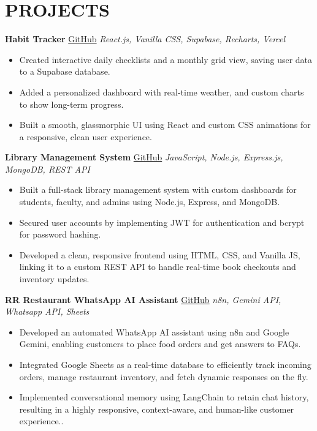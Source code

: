 \documentclass[letterpaper,11pt]{article}
\begin{document}
\section*{PROJECTS}

\noindent\textbf{Habit Tracker} \quad
\textcolor{blue}{\href{https://github.com/Rithwik007/habit-tracker-web2}{GitHub}} \hfill \textit{React.js, Vanilla CSS, Supabase, Recharts, Vercel}

\begin{itemize}
\item Created interactive daily checklists and a monthly grid view, saving user data to a Supabase database.
\item Added a personalized dashboard with real-time weather, and custom charts to show long-term progress.
\item Built a smooth, glassmorphic UI using React and custom CSS animations for a responsive, clean user experience.

\end{itemize}

\noindent\textbf{Library Management System} \quad
\textcolor{blue}{\href{https://github.com/Rithwik007/Library-Management}{GitHub}} \hfill \textit{JavaScript, Node.js, Express.js, MongoDB, REST API}

\begin{itemize}
\item Built a full-stack library management system with custom dashboards for students, faculty, and admins using Node.js, Express, and MongoDB.
\item Secured user accounts by implementing JWT for authentication and bcrypt for password hashing.
\item Developed a clean, responsive frontend using HTML, CSS, and Vanilla JS, linking it to a custom REST API to handle real-time book checkouts and inventory updates.

\end{itemize}

\noindent\textbf{RR Restaurant WhatsApp AI Assistant}  \quad
\textcolor{blue}{\href{https://github.com/Rithwik007/n8n_automation_usecase}{GitHub}} \hfill \textit{n8n, Gemini API, Whatsapp API, Sheets}


\begin{itemize}
\item Developed an automated WhatsApp AI assistant using n8n and Google Gemini, enabling customers to place food orders and get answers to FAQs.
\item Integrated Google Sheets as a real-time database to efficiently track incoming orders, manage restaurant inventory, and fetch dynamic responses on the fly.
\item Implemented conversational memory using LangChain to retain chat history, resulting in a highly responsive, context-aware, and human-like customer experience..

\end{itemize}
\end{document}
